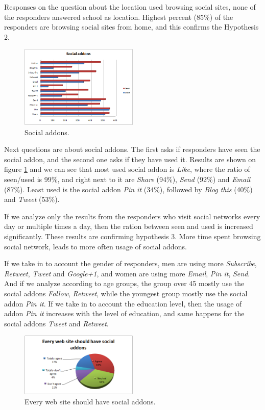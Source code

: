 \documentclass[conference]{IEEEtran}
\begin{document}
Responses on the question about the location used browsing social sites, none of
the responders answered school as location. Highest percent (85\%) of the
responders are browsing social sites from home, and this confirms the
Hypothesis 2.

\begin{figure}[htb]
\centering
\includegraphics[width=0.5\textwidth]{viral-images/social_addons}
\caption{Social addons.}
\label{fig:social_addons}
\end{figure}

Next questions are about social addons. The first asks if responders have seen
the social addon, and the second one asks if they have used it. Results are
shown on figure \ref{fig:social_addons} and we can see that most used social
addon is \emph{Like}, where the ratio of seen/used is 99\%, and right next to it are
\emph{Share} (94\%), \emph{Send} (92\%) and \emph{Email} (87\%). Least used is
the social addon \emph{Pin it} (34\%), followed by \emph{Blog this} (40\%) and
\emph{Tweet} (53\%).

If we analyze only the results from the responders who visit social networks
every day or multiple times a day, then the ration between seen and used is
increased significantly. These results are confirming hypothesis 3. More time
spent browsing social network, leads to more often usage of social addons.

If we take in to account the gender of responders, men are using more \emph{Subscribe},
\emph{Retweet}, \emph{Tweet} and \emph{Google+1}, and women are using more
\emph{Email}, \emph{Pin it}, \emph{Send}. And if we analyze according to age
groups, the group over 45 mostly use the social addons \emph{Follow},
\emph{Retweet}, while the youngest group mostly use the social addon \emph{Pin
it}. If we take in to account the education level, then the usage of addon \emph{Pin
it} increases with the level of education, and same happens for the social
addons \emph{Tweet} and \emph{Retweet}.

\begin{figure}[htb]
\centering
\includegraphics[width=0.5\textwidth]{viral-images/every_web_site}
\caption{Every web site should have social addons.}
\label{fig:every_web_site}
\end{figure}
\end{document}
